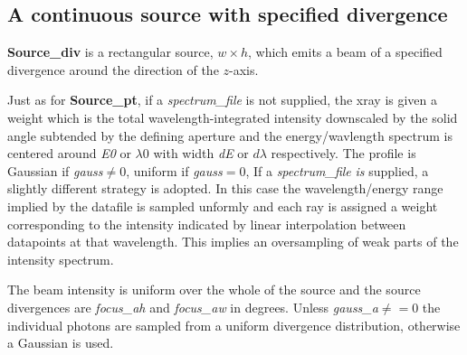 \subsection*{A continuous source with specified divergence}
\label{source-div}

\textbf{Source\_div} is a rectangular source, $w \times h$, which emits a
beam of a specified divergence around the direction of the $z$-axis.

Just as for \textbf{Source\_pt}, if a \textit{spectrum\_file} is not supplied, the xray
is given a weight which is the total wavelength-integrated intensity downscaled
by the solid angle subtended by the defining aperture and the energy/wavlength spectrum is centered around  \textit{E0} or  $\lambda 0$ with width
\textit{dE} or $d\lambda$ respectively. The profile is Gaussian if \textit{gauss}$\neq0$, uniform if \textit{gauss}$=0$,
If a \textit{spectrum\_file} \emph{is} supplied, a slightly different strategy is adopted. In this case the
wavelength/energy range implied by the datafile is sampled unformly and each ray is assigned
a weight corresponding to the intensity indicated by linear interpolation between datapoints
at that wavelength. This implies an oversampling of weak parts of the intensity spectrum.

The beam intensity is uniform over
the whole of the source and the source divergences are \textit{focus\_ah} and \textit{focus\_aw} in degrees.
Unless \textit{gauss\_a}$\neq=0$ the individual photons are sampled from a uniform divergence distribution, otherwise a Gaussian is used.


